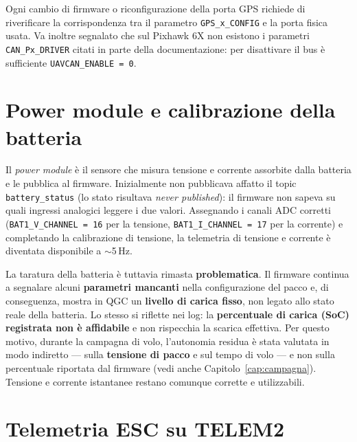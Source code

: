 \begin{notabox}
Ogni cambio di firmware o riconfigurazione della porta GPS richiede di
riverificare la corrispondenza tra il parametro \texttt{GPS\_x\_CONFIG} e la porta
fisica usata. Va inoltre segnalato che sul Pixhawk 6X non esistono i parametri
\texttt{CAN\_Px\_DRIVER} citati in parte della documentazione: per disattivare il
bus \`e sufficiente \texttt{UAVCAN\_ENABLE\,=\,0}.
\end{notabox}


\section{Power module e calibrazione della batteria}

Il \emph{power module} \`e il sensore che misura tensione e corrente assorbite
dalla batteria e le pubblica al firmware. Inizialmente non pubblicava affatto il
topic \texttt{battery\_status} (lo stato risultava \emph{never published}): il
firmware non sapeva su quali ingressi analogici leggere i due valori. Assegnando
i canali ADC corretti (\texttt{BAT1\_V\_CHANNEL\,=\,16} per la tensione,
\texttt{BAT1\_I\_CHANNEL\,=\,17} per la corrente) e completando la calibrazione di
tensione, la telemetria di tensione e corrente \`e diventata disponibile a
$\sim$5\,Hz.

La taratura della batteria \`e tuttavia rimasta \textbf{problematica}. Il firmware
continua a segnalare alcuni \textbf{parametri mancanti} nella configurazione del
pacco e, di conseguenza, mostra in QGC un \textbf{livello di carica fisso}, non
legato allo stato reale della batteria. Lo stesso si riflette nei log: la
\textbf{percentuale di carica (SoC) registrata non \`e affidabile} e non
rispecchia la scarica effettiva. Per questo motivo, durante la campagna di volo,
l'autonomia residua \`e stata valutata in modo indiretto --- sulla
\textbf{tensione di pacco} e sul tempo di volo --- e non sulla percentuale
riportata dal firmware (vedi anche Capitolo~\ref{cap:campagna}). Tensione e
corrente istantanee restano comunque corrette e utilizzabili.

\section{Telemetria ESC su TELEM2}

